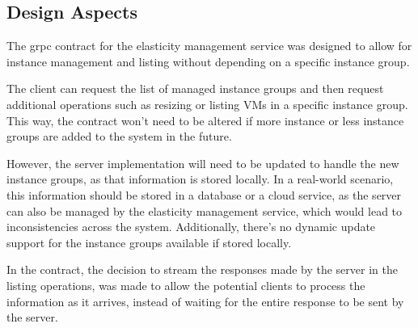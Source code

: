 \subsection{Design Aspects}\label{subsec:elasticity-management-design-aspects}

The grpc contract for the elasticity management service was designed
to allow for instance management and listing without depending on a specific instance group.

The client can request the list of managed instance groups and then request additional operations such as resizing or listing VMs in a specific instance group.
This way, the contract won't need to be altered if more instance or less instance groups are added to the system in the future.

However, the server implementation will need to be updated to handle the new instance groups,
as that information is stored locally.
In a real-world scenario, this information should be stored in a database or a cloud service, as the server can also be managed by the elasticity management service,
which would lead to inconsistencies across the system.
Additionally, there's no dynamic update support for the instance groups available if stored locally.

In the contract, the decision to stream the responses made by the server in the listing operations,
was made to allow the potential clients to process the information as it arrives,
instead of waiting for the entire response to be sent by the server.
